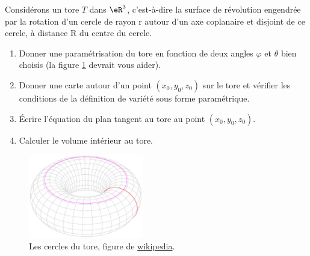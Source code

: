 
\begin{exercice}\label{exoTP20090003}


Considérons un tore $T$ dans $\eR^3$, c’est-à-dire la surface de révolution engendrée par la rotation d’un cercle de rayon r autour d’un axe coplanaire et disjoint de ce cercle, à distance R du centre du cercle.
\begin{enumerate}

	\item
		Donner une paramétrisation du tore en fonction de deux angles $\varphi$ et $\theta$ bien choisis (la figure \ref{FigToreWiki} devrait vous aider).
	\item
		Donner une carte autour d’un point $(x_0 , y_0 , z_0 )$ sur le tore et vérifier les conditions de la définition de variété sous forme paramétrique.
	\item
		Écrire l'équation du plan tangent au tore au point $(x_0 , y_0 , z_0 )$.
	\item
		Calculer le volume intérieur au tore.

\end{enumerate}
		\begin{figure}
			\includegraphics[width=5cm]{Torus_cycles.eps}
			\caption{Les cercles du tore, figure de \href{http://fr.wikipedia.org/wiki/Tore}{wikipedia}.}\label{FigToreWiki}
		\end{figure}

\end{exercice}

